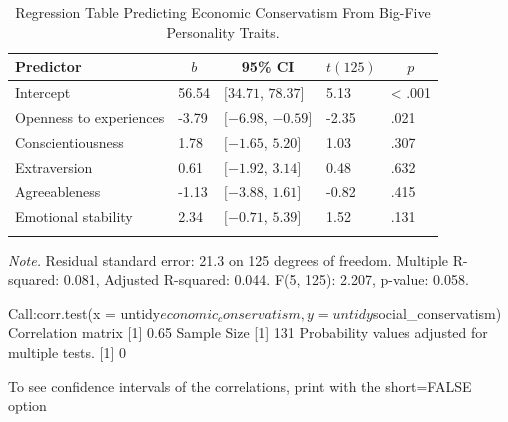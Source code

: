 \documentclass[man]{apa6}
\begin{document}
\begin{table}[tbp]
\begin{center}
\begin{threeparttable}
\caption{\label{tab:table4}Regression Table Predicting Economic Conservatism From Big-Five Personality Traits.}
\begin{tabular}{lllll}
\toprule
Predictor & \multicolumn{1}{c}{$b$} & \multicolumn{1}{c}{95\% CI} & \multicolumn{1}{c}{$t(125)$} & \multicolumn{1}{c}{$p$}\\
\midrule
Intercept & 56.54 & $[34.71$, $78.37]$ & 5.13 & < .001\\
Openness to experiences & -3.79 & $[-6.98$, $-0.59]$ & -2.35 & .021\\
Conscientiousness & 1.78 & $[-1.65$, $5.20]$ & 1.03 & .307\\
Extraversion & 0.61 & $[-1.92$, $3.14]$ & 0.48 & .632\\
Agreeableness & -1.13 & $[-3.88$, $1.61]$ & -0.82 & .415\\
Emotional stability & 2.34 & $[-0.71$, $5.39]$ & 1.52 & .131\\
\bottomrule
\addlinespace
\end{tabular}
\begin{tablenotes}[para]
\normalsize{\textit{Note.} Residual standard error: 21.3 on 125 degrees of freedom. Multiple R-squared: 0.081, Adjusted R-squared: 0.044. F(5, 125): 2.207, p-value: 0.058.}
\end{tablenotes}
\end{threeparttable}
\end{center}
\end{table}

Call:corr.test(x = untidy\(economic_conservatism, y = untidy\)social\_conservatism)
Correlation matrix
{[}1{]} 0.65
Sample Size
{[}1{]} 131
Probability values adjusted for multiple tests.
{[}1{]} 0

To see confidence intervals of the correlations, print with the short=FALSE option
\end{document}
